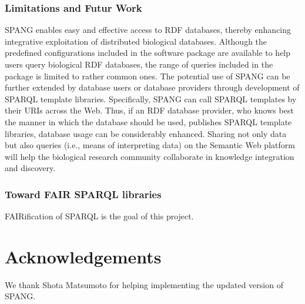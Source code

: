 \documentclass[runningheads]{llncs}
\begin{document}
\subsubsection{Limitations and Futur Work}
SPANG enables easy and effective access to RDF databases, thereby enhancing integrative exploitation of distributed biological databases.
Although the predefined configurations included in the software package are available to help users query biological RDF databases, 
the range of queries included in the package is limited to rather common ones.
The potential use of SPANG can be further extended by database users or database providers through development of SPARQL template libraries.
Specifically, SPANG can call SPARQL templates by their URIs across the Web.
Thus, if an RDF database provider,
who knows best the manner in which the database should be used,
publishes SPARQL template libraries, database usage can be considerably enhanced.
Sharing not only data but also queries (i.e., means of interpreting data) on the Semantic Web platform will help the biological research community collaborate in knowledge integration and discovery.

\subsubsection{Toward FAIR SPARQL libraries}
FAIRification of SPARQL is the goal of this project.



\section*{Acknowledgements}
We thank Shota Matsumoto for helping implementing the updated version of SPANG.




\end{document}
